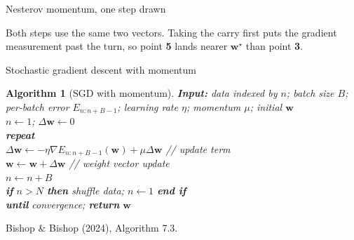 \documentclass[aspectratio=169, 11pt]{beamer}
\newtheorem{algox}[theorem]{Algorithm}
\newcommand{\srcline}[1]{%
  \par\vspace{0.25em}%
  {\scriptsize\color{mcMuted}\hfill #1\par}}
\begin{document}
\begin{frame}{Nesterov momentum, one step drawn}
\begin{center}
  \end{center}
  \vspace{-0.35em}
  \begin{redhighlight}
    Both steps use the same two vectors. Taking the carry first puts the
    gradient measurement past the turn, so point \textbf{5} lands nearer
    $\mathbf{w}^\star$ than point \textbf{3}.
  \end{redhighlight}
\end{frame}

\begin{frame}{Stochastic gradient descent with momentum}
  \vspace{0.2em}
  \begin{algox}[SGD with momentum]\label{th:algmom}
    \small
    \textbf{Input:} data indexed by $n$; batch size $B$; per-batch error
    $E_{n:n+B-1}$; learning rate $\eta$; momentum $\mu$; initial $\mathbf{w}$\\[0.35em]
    $n \leftarrow 1$; \quad $\Delta \mathbf{w} \leftarrow 0$\\
    \textbf{repeat}\\
    \hspace{1.4em} $\Delta \mathbf{w} \leftarrow -\eta \nabla E_{n:n+B-1}(\mathbf{w})
      + \mu \Delta \mathbf{w}$ \hfill \textcolor{mcMuted}{// update term}\\
    \hspace{1.4em} $\mathbf{w} \leftarrow \mathbf{w} + \Delta \mathbf{w}$
      \hfill \textcolor{mcMuted}{// weight vector update}\\
    \hspace{1.4em} $n \leftarrow n + B$\\
    \hspace{1.4em} \textbf{if} $n > N$ \textbf{then}
      \; shuffle data; \; $n \leftarrow 1$ \; \textbf{end if}\\
    \textbf{until} convergence; \quad \textbf{return} $\mathbf{w}$
  \end{algox}
  \srcline{Bishop \& Bishop (2024), Algorithm 7.3.}
\end{frame}
\end{document}
